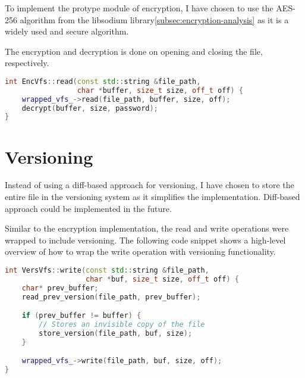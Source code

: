 To implement the protype module of encryption, I have chosen to use the AES-256 algorithm from the libsodium library\ref{subsec:encryption-analysis} as it is a widely used and secure algorithm.

The encryption and decryption is done on opening and closing the file, respectively.


\begin{lstlisting}[language=c++, basicstyle=\ttfamily\small, caption={Wrapping the read operation with encryption.}, label={lst:read}]
int EncVfs::read(const std::string &file_path,
                 char *buffer, size_t size, off_t off) {
    wrapped_vfs_->read(file_path, buffer, size, off);
    decrypt(buffer, size, password);
}
\end{lstlisting}


\section{Versioning}\label{sec:versioning2}

Instead of using a diff-based approach for versioning, I have chosen to store the entire file in the versioning system as it simplifies the implementation.
Diff-based approach could be implemented in the future.

Similar to the encryption implementation, the read and write operations were wrapped to include versioning.
The following code snippet shows a high-level overview of how to wrap the write operation with versioning functionality.

\begin{lstlisting}[language=c++, basicstyle=\ttfamily\small]
int VersVfs::write(const std::string &file_path,
                   char *buf, size_t size, off_t off) {
    char* prev_buffer;
    read_prev_version(file_path, prev_buffer);

    if (prev_buffer != buffer) {
        // Stores an invisible copy of the file
        store_version(file_path, buf, size);
    }

    wrapped_vfs_->write(file_path, buf, size, off);
}
\end{lstlisting}

